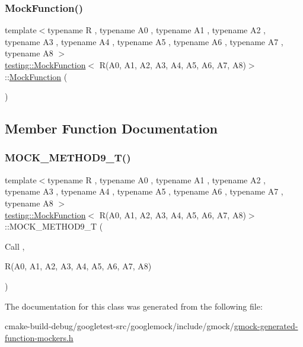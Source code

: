 \subsubsection{\texorpdfstring{MockFunction()}{MockFunction()}}
{\footnotesize\ttfamily template$<$typename R , typename A0 , typename A1 , typename A2 , typename A3 , typename A4 , typename A5 , typename A6 , typename A7 , typename A8 $>$ \\
\mbox{\hyperlink{classtesting_1_1MockFunction}{testing\+::\+Mock\+Function}}$<$ R(A0, A1, A2, A3, A4, A5, A6, A7, A8)$>$\+::\mbox{\hyperlink{classtesting_1_1MockFunction}{Mock\+Function}} (\begin{DoxyParamCaption}{ }\end{DoxyParamCaption})\hspace{0.3cm}{\ttfamily [inline]}}



\subsection{Member Function Documentation}
\mbox{\label{classtesting_1_1MockFunction_3_01R_07A0_00_01A1_00_01A2_00_01A3_00_01A4_00_01A5_00_01A6_00_01A7_00_01A8_08_4_a0fee6ada67063cc8ec8b2181021f0195}} 
\subsubsection{\texorpdfstring{MOCK\_METHOD9\_T()}{MOCK\_METHOD9\_T()}}
{\footnotesize\ttfamily template$<$typename R , typename A0 , typename A1 , typename A2 , typename A3 , typename A4 , typename A5 , typename A6 , typename A7 , typename A8 $>$ \\
\mbox{\hyperlink{classtesting_1_1MockFunction}{testing\+::\+Mock\+Function}}$<$ R(A0, A1, A2, A3, A4, A5, A6, A7, A8)$>$\+::M\+O\+C\+K\+\_\+\+M\+E\+T\+H\+O\+D9\+\_\+T (\begin{DoxyParamCaption}\item[{Call}]{,  }\item[{R(A0, A1, A2, A3, A4, A5, A6, A7, A8)}]{ }\end{DoxyParamCaption})}



The documentation for this class was generated from the following file\+:\begin{DoxyCompactItemize}
\item 
cmake-\/build-\/debug/googletest-\/src/googlemock/include/gmock/\mbox{\hyperlink{gmock-generated-function-mockers_8h}{gmock-\/generated-\/function-\/mockers.\+h}}\end{DoxyCompactItemize}
